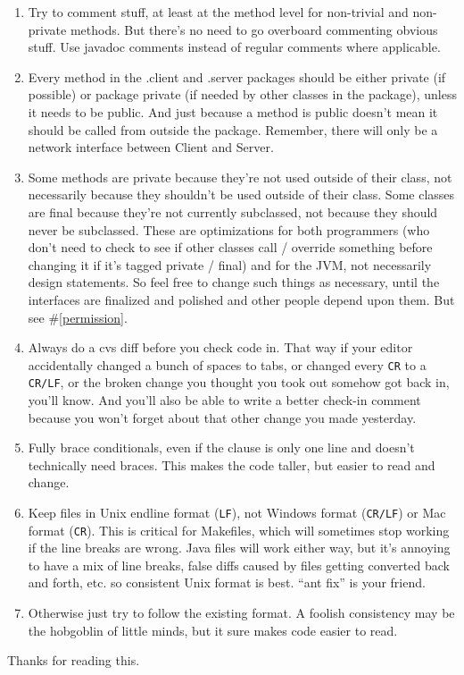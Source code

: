 \documentclass{article}
\begin{document}
\begin{enumerate}
\item Try to comment stuff, at least at the method level for
non-trivial and non-private methods. But there's no need to go 
overboard commenting obvious stuff. Use javadoc comments
instead of regular comments where applicable.

\item Every method in the .client and .server packages should be
either private (if possible) or package private (if needed
by other classes in the package), unless it needs to be public.
And just because a method is public doesn't mean it should be
called from outside the package. Remember, there will only
be a network interface between Client and Server.
\label{permission}

\item Some methods are private because they're not used outside of
their class, not necessarily because they shouldn't be used
outside of their class. Some classes are final because they're
not currently subclassed, not because they should never be
subclassed. These are optimizations for both programmers (who
don't need to check to see if other classes call / override
something before changing it if it's tagged private / final) and
for the JVM, not necessarily design statements. So feel free
to change such things as necessary, until the interfaces are
finalized and polished and other people depend upon them. But
see \#\ref{permission}.

\item Always do a cvs diff before you check code in. That way
if your editor accidentally changed a bunch of spaces to tabs,
or changed every \texttt{CR} to a \texttt{CR/LF}, or the broken
change you thought you took out somehow got back in, you'll know.
And you'll also be able to write a better check-in comment because
you won't forget about that other change you made yesterday.

\item Fully brace conditionals, even if the clause is only one line
and doesn't technically need braces. This makes the code taller,
but easier to read and change.

\item Keep files in Unix endline format (\texttt{LF}), not Windows
format (\texttt{CR/LF}) or Mac format (\texttt{CR}). This is critical
for Makefiles, which will sometimes stop working if the line breaks
are wrong. Java files will work either way, but it's annoying to have a
mix of line breaks, false diffs caused by files getting converted back
and forth, etc. so consistent Unix format is best. ``ant fix'' is your
friend.

\item Otherwise just try to follow the existing format. A foolish
consistency may be the hobgoblin of little minds, but it sure
makes code easier to read.

\end{enumerate}

Thanks for reading this.
\end{document}
